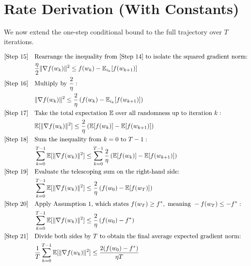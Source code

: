 \documentclass{article}
\begin{document}
\section*{Rate Derivation (With Constants)}

We now extend the one-step conditional bound to the full trajectory over $T$ iterations.

\begin{align}
    \text{[Step 15]} \quad & \text{Rearrange the inequality from [Step 14] to isolate the squared gradient norm:} \notag \\
    & \frac{\eta}{2} \|\nabla f(w_k)\|^2 \leq f(w_k) - \mathbb{E}_{i_k}[f(w_{k+1})] \\
    \text{[Step 16]} \quad & \text{Multiply by } \frac{2}{\eta}: \notag \\
    & \|\nabla f(w_k)\|^2 \leq \frac{2}{\eta} \left( f(w_k) - \mathbb{E}_{i_k}[f(w_{k+1})] \right) \\
    \text{[Step 17]} \quad & \text{Take the total expectation } \mathbb{E} \text{ over all randomness up to iteration } k: \notag \\
    & \mathbb{E}[\|\nabla f(w_k)\|^2] \leq \frac{2}{\eta} \left( \mathbb{E}[f(w_k)] - \mathbb{E}[f(w_{k+1})] \right) \\
    \text{[Step 18]} \quad & \text{Sum the inequality from } k=0 \text{ to } T-1: \notag \\
    & \sum_{k=0}^{T-1} \mathbb{E}[\|\nabla f(w_k)\|^2] \leq \sum_{k=0}^{T-1} \frac{2}{\eta} \left( \mathbb{E}[f(w_k)] - \mathbb{E}[f(w_{k+1})] \right) \\
    \text{[Step 19]} \quad & \text{Evaluate the telescoping sum on the right-hand side:} \notag \\
    & \sum_{k=0}^{T-1} \mathbb{E}[\|\nabla f(w_k)\|^2] \leq \frac{2}{\eta} \left( f(w_0) - \mathbb{E}[f(w_T)] \right) \\
    \text{[Step 20]} \quad & \text{Apply Assumption 1, which states } f(w_T) \geq f^*, \text{ meaning } -f(w_T) \leq -f^*: \notag \\
    & \sum_{k=0}^{T-1} \mathbb{E}[\|\nabla f(w_k)\|^2] \leq \frac{2}{\eta} \left( f(w_0) - f^* \right) \\
    \text{[Step 21]} \quad & \text{Divide both sides by } T \text{ to obtain the final average expected gradient norm:} \notag \\
    & \frac{1}{T} \sum_{k=0}^{T-1} \mathbb{E}[\|\nabla f(w_k)\|^2] \leq \frac{2(f(w_0) - f^*)}{\eta T}
\end{align}
\end{document}
